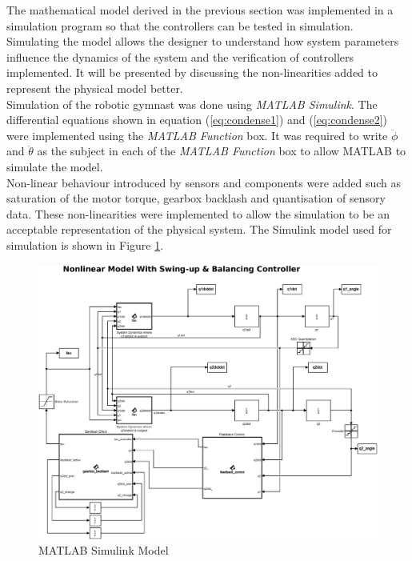 The mathematical model derived in the previous section was implemented in a simulation program so that the controllers can be tested in simulation. Simulating the model allows the designer to understand how system parameters influence the dynamics of the system and the verification of controllers implemented. It will be presented by discussing the non-linearities added to represent the physical model better.\\

Simulation of the robotic gymnast was done using \textit{MATLAB Simulink}. The differential equations shown in equation (\ref{eq:condense1}) and (\ref{eq:condense2}) were implemented using the \textit{MATLAB Function} box. It was required to write $\ddot{\phi}$ and $\ddot{\theta}$ as the subject in each of the \textit{MATLAB Function} box to allow MATLAB to simulate the model.\\

Non-linear behaviour introduced by sensors and components were added such as saturation of the motor torque, gearbox backlash and quantisation of sensory data. These non-linearities were implemented to allow the simulation to be an acceptable representation of the physical system. The Simulink model used for simulation is shown in Figure \ref{fig:sim_nonlinearfeedback}.

\begin{figure}[h]
	\centering
	\includegraphics[scale=0.3]{./figs/simulink/latex_simulink.eps}
	\caption{MATLAB Simulink Model}
	\label{fig:sim_nonlinearfeedback}
\end{figure}

